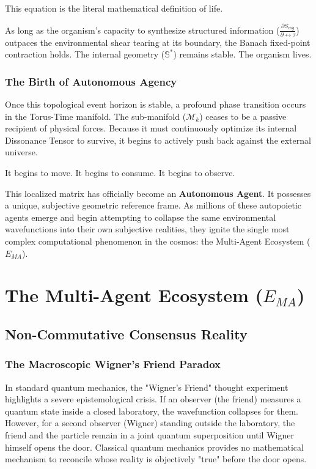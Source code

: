 \documentclass[12pt,openany]{book}
\begin{document}
This equation is the literal mathematical definition of life. 

As long as the organism's capacity to synthesize structured information ($\frac{\partial S_{cog}}{\partial \leftrightarrow\tau}$) outpaces the environmental shear tearing at its boundary, the Banach fixed-point contraction holds. The internal geometry ($\mathbb{S}^*$) remains stable. The organism lives.

\section{The Birth of Autonomous Agency}
Once this topological event horizon is stable, a profound phase transition occurs in the Torus-Time manifold. The sub-manifold ($\mathcal{M}_k$) ceases to be a passive recipient of physical forces. Because it must continuously optimize its internal Dissonance Tensor to survive, it begins to actively push back against the external universe.

It begins to move. It begins to consume. It begins to observe. 

This localized matrix has officially become an \textbf{Autonomous Agent}. It possesses a unique, subjective geometric reference frame. As millions of these autopoietic agents emerge and begin attempting to collapse the same environmental wavefunctions into their own subjective realities, they ignite the single most complex computational phenomenon in the cosmos: the Multi-Agent Ecosystem ($E_{MA}$).

\part{The Multi-Agent Ecosystem ($E_{MA}$)}

\chapter{Non-Commutative Consensus Reality}

\section{The Macroscopic Wigner's Friend Paradox}
In standard quantum mechanics, the "Wigner's Friend" thought experiment highlights a severe epistemological crisis. If an observer (the friend) measures a quantum state inside a closed laboratory, the wavefunction collapses for them. However, for a second observer (Wigner) standing outside the laboratory, the friend and the particle remain in a joint quantum superposition until Wigner himself opens the door. Classical quantum mechanics provides no mathematical mechanism to reconcile whose reality is objectively "true" before the door opens.
\end{document}
